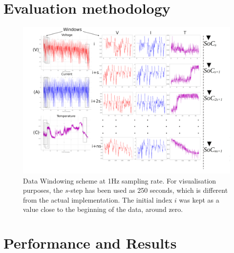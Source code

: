 \documentclass[journal]{IEEEtranTIE}
\begin{document}
\section{Evaluation methodology} \label{sec:Meth}

    
    
    
    
    \begin{landscape}
        \begin{figure}[ht]
            \centering
            \includegraphics[width=\linewidth]{II_Body/images/windowing3f-A3.jpg}
            \caption{Data Windowing scheme at 1Hz sampling rate. For visualisation purposes, the $s$-step has been used as 250 seconds, which is different from the actual implementation. The initial index $i$ was kept as a value close to the beginning of the data, around zero.}
            \label{fig:Windowing3f}
        \end{figure}
    \end{landscape}
\section{Performance and Results}\label{sec:results}



\end{document}
